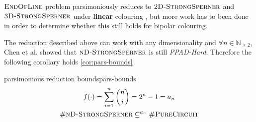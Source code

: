 $\textsc{EndOfLine}$ problem parsimoniously reduces to $\textsc{2D-StrongSperner}$ and $\textsc{3D-StrongSperner}$
under \textbf{linear} colouring \cite{chen_Complexity2DDiscrete_2009, daskalakis_ComplexityComputingNash_2006}, but more
work has to been done in order to determine whether this still holds for bipolar colouring.


The reduction described above can work with any dimensionality
and $\forall n \in \mathbb{N}_{\geq 2}$, Chen et al. \cite{chen_SettlingComplexityComputing_2009} showed that
$\textsc{nD-StrongSperner}$ is still \textit{PPAD-Hard}.
Therefore the following corollary holds \ref{cor:pars-bounds}

\begin{corollarybox}{ parsimonious reduction bounds}{pars-bounds}
    \begin{gather*}
        f(\cdot) = \sum_{i = 1}^{n}\binom{n}{i} = 2^n - 1 = a_n \\
        \textnormal{\textsc{\#nD-StrongSperner}} \subseteq^{a_n} \textnormal{\textsc{\#PureCircuit}}
    \end{gather*}
\end{corollarybox}



%

